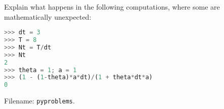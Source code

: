 \documentclass[graybox,sectrefs,envcountresetchap,open=right,final]{svmonodo}
\makeatletter
\newenvironment{doconceexercise}{}{}
\newcounter{doconceexercisecounter}%
\newcommand\listofexercises{
\chapter*{List of Exercises, Problems, and Projects
          \@mkboth{List of Exercises, Problems, and Projects}{List of Exercises, Problems, and Projects}}
\markboth{List of Exercises, Problems, and Projects}{List of Exercises, Problems, and Projects}
\@starttoc{loe}
}
\makeatother
\begin{document}
\begin{doconceexercise}

                
\label{decay:exer:intdiv}

Explain what happens in the following computations, where
some are mathematically unexpected:










\begin{lstlisting}[language=python,style=blue1_bluegreen]
>>> dt = 3
>>> T = 8
>>> Nt = T/dt
>>> Nt
2
>>> theta = 1; a = 1
>>> (1 - (1-theta)*a*dt)/(1 + theta*dt*a)
0

\end{lstlisting}


\noindent Filename: \texttt{pyproblems}.

\end{doconceexercise}
\end{document}
